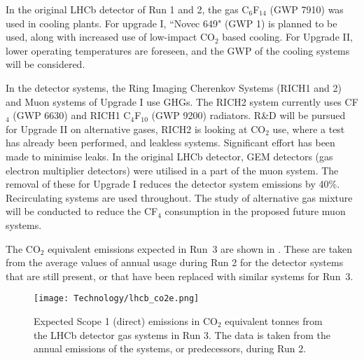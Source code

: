 \documentclass[../SustainableHEP.tex]{subfiles}
\begin{document}
\begin{casestudy}
In the original LHCb detector of Run 1 and 2, the gas C$_6$F$_{14}$ (GWP 7910) was used in cooling plants. For upgrade I, ``Novec 649" (GWP 1) is planned to be used, along with 
increased use of low-impact CO$_2$ based cooling.
For Upgrade II, lower operating temperatures are foreseen, and the GWP of the cooling systems will be considered.

In the detector systems, the Ring Imaging Cherenkov Systems (RICH1 and 2) and Muon systems of Upgrade I use GHGs. The RICH2 system currently uses CF$_4$ (GWP 6630) and RICH1 C$_4$F$_{10}$ (GWP 9200) radiators. R\&D will be pursued for Upgrade II on alternative gases, RICH2 is looking at CO$_2$ use, where a test has already been performed, and leakless systems. Significant effort has been made to minimise leaks.  
In the original LHCb detector, GEM detectors (gas electron multiplier detectors) were utilised in a part of the muon system. The removal of these for Upgrade I reduces the detector system emissions by 40\%. 
Recirculating systems are used throughout. The study of alternative gas mixture will be conducted to reduce the CF$_4$ consumption in the proposed future muon systems.

The CO$_2$ equivalent emissions expected in Run~3 are shown in . These are taken from the average values of annual usage during Run 2 for the detector systems that are still present, or that have been replaced with similar systems for Run~3. 

\begin{figure}
    \captionsetup{type=figure}
    {\texttt{[image: Technology/lhcb\_co2e.png]}}
    \caption[Expected Scope 1 emissions from LHCb detector gas systems in Run 3]{Expected Scope 1 (direct)  emissions in CO$_2$ equivalent tonnes from the LHCb detector gas systems in Run 3. The data is taken from the annual emissions of the systems, or predecessors, during Run 2.}\label{fig:LHCbCO2e}
\end{figure}


\end{casestudy}
\end{document}
